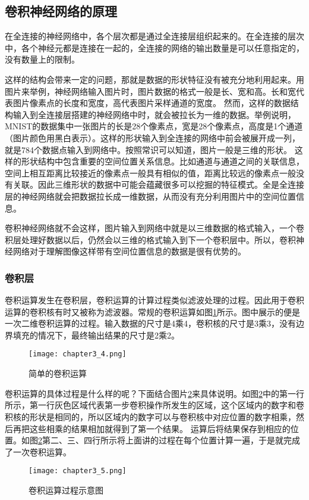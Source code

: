 \subsection{卷积神经网络的原理}
在全连接的神经网络中，各个层次都是通过全连接层组织起来的。在全连接的层次中，各个神经元都是连接在一起的，全连接的网络的输出数量是可以任意指定的，没有数量上的限制。

这样的结构会带来一定的问题，那就是数据的形状特征没有被充分地利用起来。用图片来举例，神经网络输入图片时，图片数据的格式一般是长、宽和高。长和宽代表图片像素点的长度和宽度，高代表图片采样通道的宽度。
然而，这样的数据结构输入到全连接层搭建的神经网络中时，就会被拉长为一维的数据。举例说明，MNIST的数据集中一张图片的长是28个像素点，宽是28个像素点，高度是1个通道（图片颜色用黑白表示）。这样的形状输入到全连接的网络中前会被展开成一列，就是784个数据点输入到网络中。按照常识可以知道，图片一般是三维的形状。
这样的形状结构中包含重要的空间位置关系信息。比如通道与通道之间的关联信息，空间上相互距离比较接近的像素点一般具有相似的值，距离比较远的像素点一般没有关联。因此三维形状的数据中可能会蕴藏很多可以挖掘的特征模式。全是全连接层的神经网络就会把数据拉长成一维数据，从而没有充分利用图片中的空间位置信息。

卷积神经网络就不会这样，图片输入到网络中就是以三维数据的格式输入，一个卷积层处理好数据以后，仍然会以三维的格式输入到下一个卷积层中。所以，卷积神经网络对于理解图像这样带有空间位置信息的数据是很有优势的。

\subsubsection{卷积层}
卷积运算发生在卷积层，卷积运算的计算过程类似滤波处理的过程。因此用于卷积运算的卷积核有时又被称为滤波器。常规的卷积运算如图\ref{fig:chapter3_4}所示。图中展示的便是一次二维卷积运算的过程。输入数据的尺寸是4乘4，卷积核的尺寸是3乘3，没有边界填充的情况下，最终输出结果的尺寸是2乘2。
\begin{figure}
    \centering
    \texttt{[image: chapter3\_4.png]}
    \caption{简单的卷积运算\cite{luyujie_204}}
    \label{fig:chapter3_4}
\end{figure}

卷积运算的具体过程是什么样的呢？下面结合图片\ref{fig:chapter3_5}来具体说明。如图\ref{fig:chapter3_5}中的第一行所示，第一行灰色区域代表第一步卷积操作所发生的区域，这个区域内的数字和卷积核的形状是相同的，所以区域内的数字可以与卷积核中对应位置的数字相乘，然后再把这些相乘的结果相加就得到了第一个结果。
运算后将结果保存到相应的位置。如图\ref{fig:chapter3_5}第二、三、四行所示将上面讲的过程在每个位置计算一遍，于是就完成了一次卷积运算。
\begin{figure}
    \centering
    \texttt{[image: chapter3\_5.png]}
    \caption{卷积运算过程示意图\cite{luyujie_205}}
    \label{fig:chapter3_5}
\end{figure}

